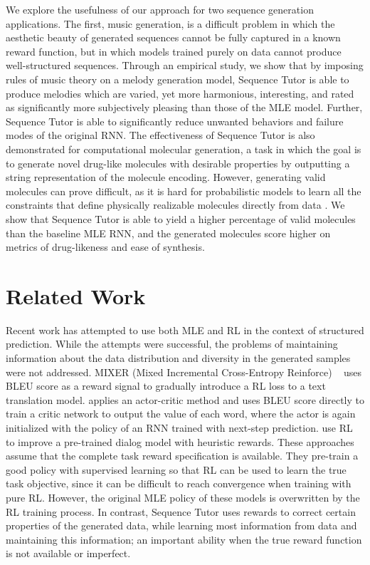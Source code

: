 We explore the usefulness of our approach for two sequence generation applications. The first, music generation, is a difficult problem in which the aesthetic beauty of generated sequences cannot be fully captured in a known reward function, but in which models trained purely on data cannot produce well-structured sequences. Through an empirical study, we show that by imposing rules of music theory on a melody generation model, Sequence Tutor is able to produce melodies which are varied, yet more harmonious, interesting, and rated as significantly more subjectively pleasing than those of the MLE model. Further, Sequence Tutor is able to significantly reduce unwanted behaviors and failure modes of the original RNN. The effectiveness of Sequence Tutor is also demonstrated for computational molecular generation, a task in which the goal is to generate novel drug-like molecules with desirable properties by outputting a string representation of the molecule encoding. However, generating valid molecules can prove difficult, as it is hard for probabilistic models to learn all the constraints that define physically realizable molecules directly from data \cite{gomez2016automatic}. We show that Sequence Tutor is able to yield a higher percentage of valid molecules than the baseline MLE RNN, and the generated molecules score higher on metrics of drug-likeness and ease of synthesis.  

\section{Related Work}
\label{sec:related}
Recent work has attempted to use both MLE and RL in the context of structured prediction. While the attempts were successful, the problems of maintaining information about the data distribution and diversity in the generated samples were not addressed. MIXER (Mixed Incremental Cross-Entropy Reinforce) ~\citep{ranzato} uses BLEU score as a reward signal to gradually introduce a RL loss to a text translation model. 
\citet{bahdanau} applies an actor-critic method and uses BLEU score directly to train a critic network to output the value of each word, where the actor is again initialized with the policy of an RNN trained with next-step prediction. \citet{li2016deep} use RL to improve a pre-trained dialog model with heuristic rewards. These approaches assume that the complete task reward specification is available. They pre-train a good policy with supervised learning so that RL can be used to learn the true task objective, since it can be difficult to reach convergence when training with pure RL. However, the original MLE policy of these models is overwritten by the RL training process. In contrast, Sequence Tutor uses rewards to correct certain properties of the generated data, while learning most information from data and maintaining this information; an important ability when the true reward function is not available or imperfect.

